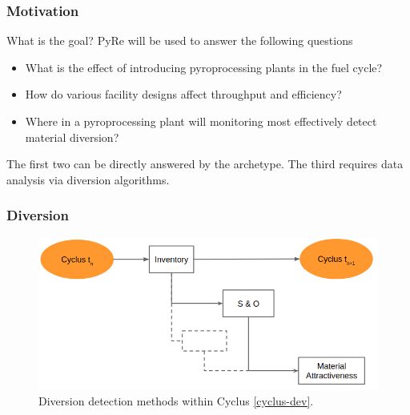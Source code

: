 \begin{frame}
  \frametitle{Motivation}
 \begin{block}{What is the goal?}
 	PyRe will be used to answer the following questions
 	\begin{itemize}
 		\item What is the effect of introducing pyroprocessing plants in the fuel cycle?
 		\item How do various facility designs affect throughput and efficiency?
 		\item Where in a pyroprocessing plant will monitoring most 
 		effectively detect material diversion?
 	\end{itemize}
\end{block}
The first two can be directly answered by the archetype. The third requires data analysis via
diversion algorithms.	
\end{frame}

\begin{frame}
  \frametitle{Diversion}
        \begin{figure}
        	\centering
        	\includegraphics[width=0.9\linewidth]{diversion1}
        	\caption{Diversion detection methods within Cyclus \ref{cyclus-dev}.}
        \end{figure}
\end{frame}
